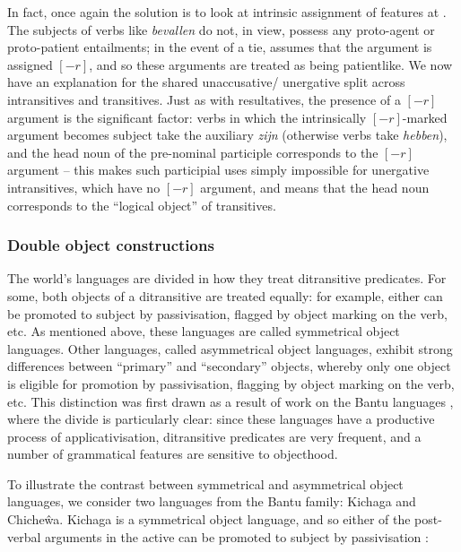 \documentclass[output=paper]{langscibook}
\begin{document}
In fact, once again the solution is to look at intrinsic assignment of features
at \astruc. The subjects of verbs like \textit{bevallen} do not, in
 view, possess any proto-agent or proto-patient
entailments; in the event of a tie, \citet[150]{zaenen93} assumes that the
argument is assigned $[-r]$, and so these arguments are treated as being
patientlike. We now have an explanation for the shared unaccusative\slash
unergative split across intransitives and transitives. Just as with
resultatives, the presence of a $[-r]$ argument is the significant factor:
verbs in which the intrinsically $[-r]$-marked argument becomes subject take the
auxiliary \textit{zijn} (otherwise verbs take \textit{hebben}), and the head
noun of the pre-nominal participle corresponds to the $[-r]$ argument -- this
makes such participial uses simply impossible for unergative intransitives,
which have no $[-r]$ argument, and means that the head noun corresponds to the
``logical object'' of transitives.

\subsubsection{Double object constructions}\label{sec:argstr:double-object}

The world's languages are divided in how they treat ditransitive predicates. For
some, both objects of a ditransitive are treated equally: for example, either
can be promoted to subject by passivisation, flagged by object marking on the
verb, etc. As mentioned above, these languages are called symmetrical object
languages. Other languages, called asymmetrical object languages, exhibit strong
differences between ``primary'' and ``secondary'' objects, whereby only one
object is eligible for promotion by passivisation, flagging by object marking on
the verb, etc. This distinction was first drawn as a result of work on the Bantu
languages \citep[e.g.][]{Gary:UG,Kisseberth:Chimwini,Baker1988}, where the
divide is particularly clear: since these languages have a productive process of
applicativisation, ditransitive predicates are very frequent, and a number of
grammatical features are sensitive to objecthood.

To illustrate the contrast between symmetrical and asymmetrical object
languages, we consider two languages from the Bantu family: Kichaga and
Chiche\^{w}a. Kichaga is a symmetrical object language, and so either of the
post-verbal arguments in the active can be promoted to subject by passivisation \citep[150]{BresMosh90}:
\end{document}
